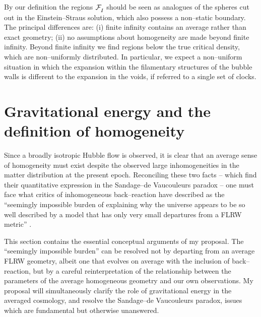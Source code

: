 \documentclass[12pt]{article}
\begin{document}
By our definition the regions $\FI$ should be seen as analogues of
the spheres cut out in the Einstein--Straus solution, which also
possess a non--static boundary. The principal
differences are: (i) finite infinity contains an average rather than exact
geometry; (ii) no assumptions about homogeneity are made beyond
finite infinity. Beyond finite infinity we find regions below the
true critical density, which are non--uniformly distributed. In particular,
we expect a non--uniform situation in which the expansion within the
filamentary structures of the bubble walls is different to the expansion
in the voids, if referred to a single set of clocks.

\section{Gravitational energy and the definition of homogeneity\label{surfs}}

Since a broadly isotropic Hubble flow is observed, it is clear that an
average sense of homogeneity must exist despite the observed large
inhomogeneities in the matter distribution at the present epoch. Reconciling
these two facts -- which find their quantitative expression in the
Sandage--de Vaucouleurs paradox -- one must face what critics of inhomogeneous
back--reaction have described as the ``seemingly impossible burden of
explaining why the universe appears to be so well described by a model
that has only very small departures from a FLRW metric'' \cite{IW}.

This section contains the essential conceptual arguments of my proposal.
The ``seemingly impossible burden'' can be resolved not by departing from an
average FLRW geometry, albeit one that evolves on average with the inclusion of
back--reaction, but by a careful reinterpretation of the relationship between
the parameters of the average homogeneous geometry and our own observations.
My proposal will simultaneously clarify the role of gravitational energy in
the averaged cosmology, and resolve the Sandage--de Vaucouleurs paradox,
issues which are fundamental but otherwise unanswered.
\end{document}
